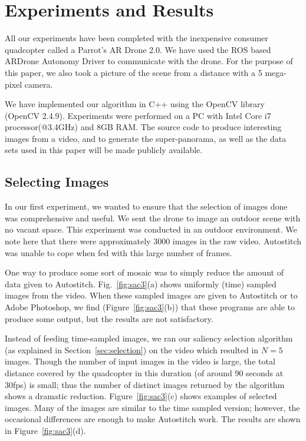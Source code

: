 \section{Experiments and Results}
\label{sec:results}

All our experiments have been completed with the inexpensive consumer
quadcopter called a Parrot's AR Drone 2.0. We have used the ROS based
ARDrone Autonomy Driver to communicate with the drone. For the
purpose of this paper, we also took a  picture of the scene from a
distance with a 5 mega-pixel camera.

We have implemented our algorithm in C++ using the OpenCV library
(OpenCV 2.4.9). Experiments were performed on a PC with Intel Core i7
processor(@3.4GHz) and 8GB RAM.  The source code to produce
interesting images from a video, and to generate the super-panorama,
as well as the data sets used in this paper will be made publicly
available.


\subsection{Selecting Images}

In our first experiment, we wanted to ensure that the selection of
images done was comprehensive and useful.  We sent the drone to image 
an outdoor scene with no vacant space. This experiment was conducted
in an outdoor environment. We note here that there were approximately
3000 images in the raw video.  Autostitch was unable to cope  when fed
with this large number of frames.

One way to produce some sort of mosaic was to simply reduce the amount
of data given to Autostitch.  Fig.~\ref{fig:sac3}(a) shows uniformly
(time) sampled images from the video.  When these sampled images are
given to Autostitch or to Adobe Photoshop, we find
(Figure~\ref{fig:sac3}(b)) that these programs are able to produce
some output, but the results are not satisfactory.

Instead of feeding time-sampled images, we ran our saliency selection
algorithm (as explained in Section~\ref{sec:selection}) on the video
which resulted in $N = 5$ images.  Though the number of input images
in the video is large, the total distance covered by the quadcopter in
this duration (of around 90 seconds at 30fps) is small; thus the
number of distinct images returned by the algorithm shows a dramatic
reduction. Figure~\ref{fig:sac3}(c) shows examples of selected images.
Many of the images are similar to the time sampled version; however,
the occasional differences are enough to make Autostitch work. The
results are shown in Figure~\ref{fig:sac3}(d).


